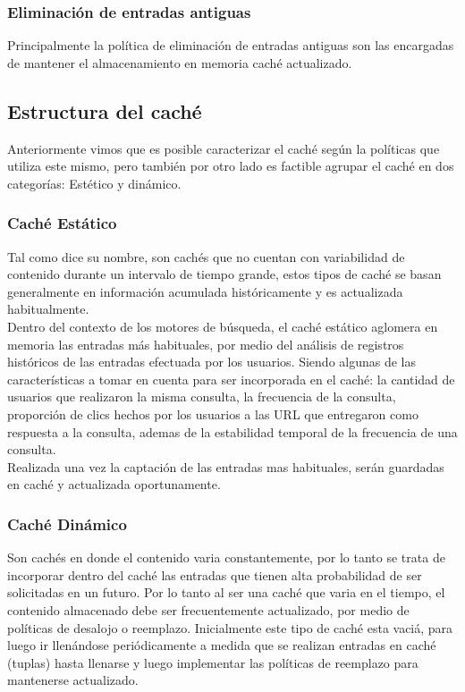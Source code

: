 \documentclass[12pt]{ociamthesis}  %
\begin{document}
\subsubsection{Eliminación de entradas antiguas}
Principalmente la política de eliminación de entradas antiguas son las encargadas de mantener el almacenamiento en memoria caché actualizado.\\ 

\subsection{Estructura del caché}
Anteriormente vimos que es posible caracterizar el caché según la políticas que utiliza este mismo, pero también por otro lado es factible agrupar el caché en dos categorías: Estético y dinámico.\\

\subsubsection{Caché Estático}
Tal como dice su nombre, son cachés que no cuentan con variabilidad de contenido durante un intervalo de tiempo grande, estos tipos de caché se basan generalmente en información acumulada históricamente y es actualizada habitualmente.\\

Dentro del contexto de los motores de búsqueda, el caché estático aglomera en memoria las entradas más habituales, por medio del análisis de registros históricos de las entradas efectuada por los usuarios. Siendo algunas de las características a tomar en cuenta para ser incorporada en el caché: la cantidad de usuarios que realizaron la misma consulta, la frecuencia de la consulta, proporción de clics hechos por los usuarios a las URL que entregaron como respuesta a la consulta, ademas de la estabilidad temporal de la frecuencia de una consulta.\\

Realizada una vez la captación de las entradas mas habituales, serán guardadas en caché y actualizada oportunamente.\\

\subsubsection{Caché Dinámico}
Son cachés en donde el contenido varia constantemente, por lo tanto se trata de incorporar dentro del caché las entradas que tienen alta probabilidad de ser solicitadas en un futuro. Por lo tanto al ser una caché que varia en el tiempo, el contenido almacenado debe ser frecuentemente actualizado, por medio de políticas de desalojo o reemplazo. Inicialmente este tipo de caché esta vaciá, para luego ir llenándose periódicamente a medida que se realizan entradas en caché (tuplas) hasta llenarse y luego implementar las políticas de reemplazo para mantenerse actualizado.\\
\end{document}
